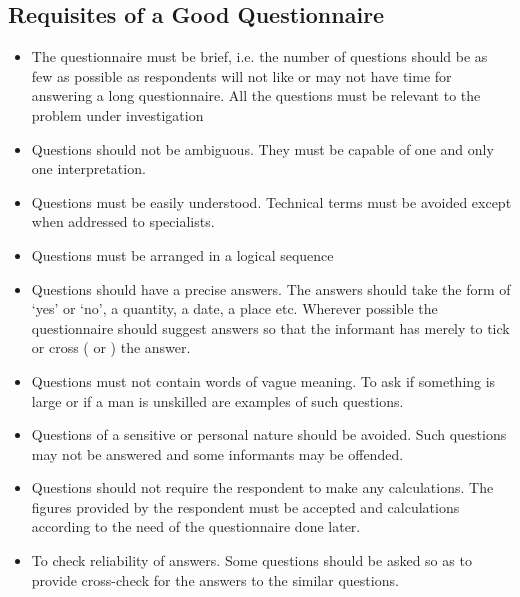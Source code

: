 \documentclass[
10pt, %
a4paper, %
]{report}
\begin{document}
\subsection{Requisites of a Good Questionnaire}
\begin{itemize}
\item The questionnaire must be brief, i.e. the number of questions
should be as few as possible as respondents will not like or may not have time for answering a long questionnaire. All the questions must be relevant to the problem under investigation
\item Questions should not be ambiguous. They must be capable of
one and only one interpretation.
\item Questions must be easily understood. Technical terms
must be avoided except when addressed to specialists.
\item Questions must be arranged in a logical sequence
\item Questions should have a precise answers. The answers should take the form of ‘yes’ or ‘no’, a quantity, a date, a place etc. Wherever possible the questionnaire should suggest answers so that the informant has merely to tick or cross ( or ) the answer.
\item Questions must not contain words of vague meaning. To ask if something is large or if a man is unskilled are examples of such questions.
\item Questions of a sensitive or personal nature should be avoided. Such questions may not be answered and some informants may be offended.
\item Questions should not require the respondent to make any
calculations. The figures provided by the respondent must
be accepted and calculations according to the need of the
questionnaire done later.
\item To check reliability of answers. Some questions should be
asked so as to provide cross-check for the answers to the
similar questions.
\end{itemize}
\end{document}
